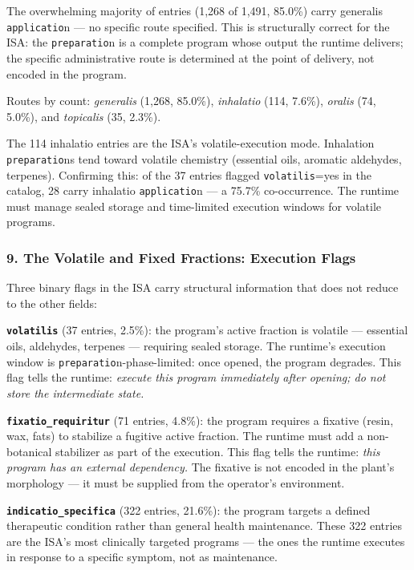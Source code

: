 The overwhelming majority of entries (1,268 of 1,491, 85.0\%) carry
generalis \texttt{applicatio}n --- no specific route specified. This is
structurally correct for the ISA: the \texttt{preparatio}n is a complete
program whose output the runtime delivers; the specific administrative
route is determined at the point of delivery, not encoded in the
program.

Routes by count: \emph{generalis} (1,268, 85.0\%), \emph{inhalatio}
(114, 7.6\%), \emph{oralis} (74, 5.0\%), and \emph{topicalis} (35,
2.3\%).

The 114 inhalatio entries are the ISA's volatile-execution mode.
Inhalation \texttt{preparatio}ns tend toward volatile chemistry
(essential oils, aromatic aldehydes, terpenes). Confirming this: of the
37 entries flagged \texttt{volatilis}=yes in the catalog, 28 carry
inhalatio \texttt{applicatio}n --- a 75.7\% co-occurrence. The runtime
must manage sealed storage and time-limited execution windows for
volatile programs.

\hypertarget{the-volatile-and-fixed-fractions-execution-flags}{%
\subsubsection{9. The Volatile and Fixed Fractions: Execution
Flags}\label{the-volatile-and-fixed-fractions-execution-flags}}

Three binary flags in the ISA carry structural information that does not
reduce to the other fields:

\textbf{\texttt{volatilis}} (37 entries, 2.5\%): the program's active
fraction is volatile --- essential oils, aldehydes, terpenes ---
requiring sealed storage. The runtime's execution window is
\texttt{preparatio}n-phase-limited: once opened, the program degrades.
This flag tells the runtime: \emph{execute this program immediately
after opening; do not store the intermediate state.}

\textbf{\texttt{fixatio\_requiritur}} (71 entries, 4.8\%): the program
requires a fixative (resin, wax, fats) to stabilize a fugitive active
fraction. The runtime must add a non-botanical stabilizer as part of the
execution. This flag tells the runtime: \emph{this program has an
external dependency.} The fixative is not encoded in the plant's
morphology --- it must be supplied from the operator's environment.

\textbf{\texttt{indicatio\_specifica}} (322 entries, 21.6\%): the
program targets a defined therapeutic condition rather than general
health maintenance. These 322 entries are the ISA's most clinically
targeted programs --- the ones the runtime executes in response to a
specific symptom, not as maintenance.

